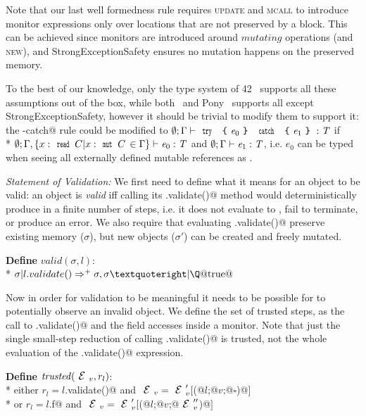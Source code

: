 
Note that our last well formedness rule requires 
\textsc{update} and \textsc{mcall} to introduce
monitor expressions only over locations
that are not preserved by a \Q@try@ block.
This can be achieved since monitors are introduced
around $\mathit{mutating}$ operations
(and \textsc{new}),
and StrongExceptionSafety ensures no mutation happens on the preserved memory.

To the best of our knowledge, only the type system of 42~\cite{ServettoEtAl13a,ServettoZucca15}
 supports all these assumptions out of the box,
while both~\cite{GordonEtAl12} and Pony~\cite{clebsch2015deny,clebsch2017orca} supports all except StrongExceptionSafety,
however it should be trivial to modify them to support it:
the \Q@try-catch@ rule could be modified to
$\emptyset;\Gamma\vdash\Kw{try}\ \oC\e_0\cC\ \Kw{catch}\ \oC\e_1\cC:\T$
if\\* $\emptyset;
\Gamma,\{x:\Kw{read}\,C | x:\Kw{mut}\,C\,\in\Gamma\}
\vdash\e_0:\T$ and $\emptyset;\Gamma\vdash\e_1:\T$,
i.e. $e_0$ can be typed when seeing all externally defined mutable references as \Q@read@.

\loseSpace
\noindent\textit{Statement of Validation:}
We first need to define what it means for an object to be valid: an object is \emph{valid} iff calling its \Q@.validate()@ method would
deterministically produce \Q@true@ in a finite number of steps, i.e. it does not evaluate to \Q@false@, fail to terminate, or produce an error.
We also require that evaluating \Q@.validate()@ preserve existing memory ($\sigma$), but new objects ($\sigma'$) can be created and freely mutated.

\noindent\textbf{Define} $valid(\sigma,l)$:\\*
\indent $\sigma | l.validate()\Rightarrow^+ \sigma,\sigma’ | \text{\Q@true@}$

\noindent Now in order for validation to be meaningful it needs to be possible for \Q@validate@ to potentially observe an invalid object.
We define the set of trusted steps, 
as the call to \Q@.validate()@ and the field accesses inside a monitor.
Note that just the single small-step reduction
of calling \Q@.validate()@ is trusted, not the whole evaluation of the \Q@.validate()@ expression.


\noindent\textbf{Define} $\mathit{trusted}(\ctx_v,r_l)$:\\*
\indent either
$r_l=l$\Q@.validate()@ and
 $\ctx_v=\ctx_v'[$\Q@M(@$l$\Q@;@$v$\Q@;@$\square$\Q@)@$]$\\*
\indent or
$r_l=l$\Q@.f@ and
 $\ctx_v=\ctx_v'[$\Q@M(@$l$\Q@;@$v$\Q@;@$\ctx_v''$\Q@)@$]$

